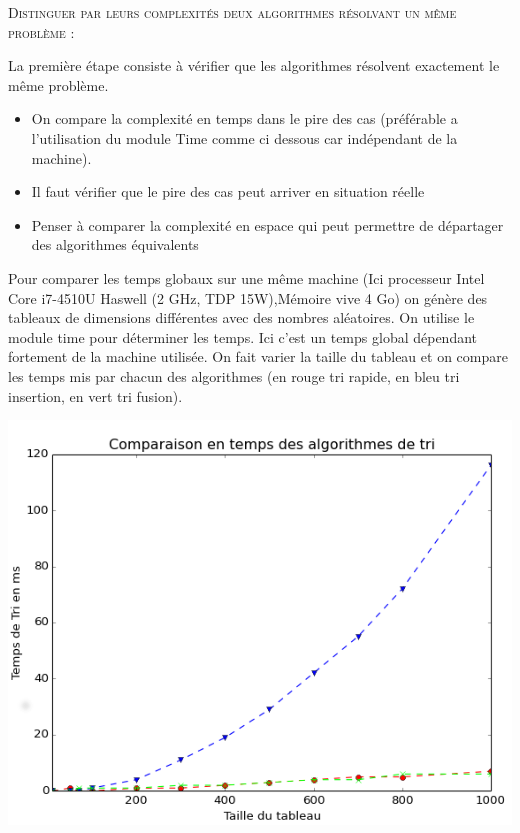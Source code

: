 
\begin{prop}

\textsc{Distinguer par leurs complexités deux algorithmes résolvant
un même problème :}

La première étape consiste à vérifier que les algorithmes résolvent exactement le même problème.

\begin{itemize}
\item On compare la complexité en temps dans le pire des cas (préférable a l'utilisation du module Time comme ci dessous car indépendant de la machine).
\item Il faut vérifier que le pire des cas peut arriver en situation réelle
\item Penser à comparer la complexité en espace qui peut permettre de départager des algorithmes équivalents
\end{itemize}
\end{prop}

\begin{exemple2}

Pour comparer les temps globaux sur une même machine (Ici processeur	Intel Core i7-4510U Haswell (2 GHz, TDP 15W),Mémoire vive 4 Go) on génère des tableaux de dimensions différentes avec des nombres aléatoires.
On utilise le module time pour déterminer les temps. Ici c'est un temps global dépendant fortement de la machine utilisée.
On fait varier la taille du tableau et on compare les temps mis par chacun des algorithmes (en rouge tri rapide, en bleu tri insertion, en vert tri fusion). 

\begin{center}
\includegraphics[width=.7\textwidth]{images/Fin.png}
\end{center}

\end{exemple2}




